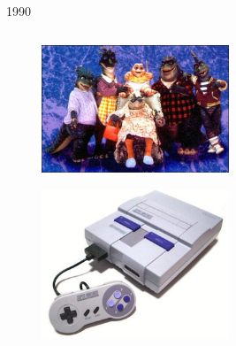 \documentclass[10pt, compress, aspectratio=169]{beamer}
\begin{document}
\begin{frame}{1990}
\begin{columns}[T]
    \hfill
    \begin{column}{.5\textwidth}
      \begin{figure}[ht]
        \centering
        \includegraphics[width=0.5\textwidth, keepaspectratio=true]{images/1990_3.jpg}
      \end{figure}
      \begin{figure}[ht]
        \centering
        \includegraphics[width=0.5\textwidth, keepaspectratio=true]{images/1990_4.jpg}
      \end{figure}
    \end{column}
  \end{columns}
\end{frame}
\end{document}
